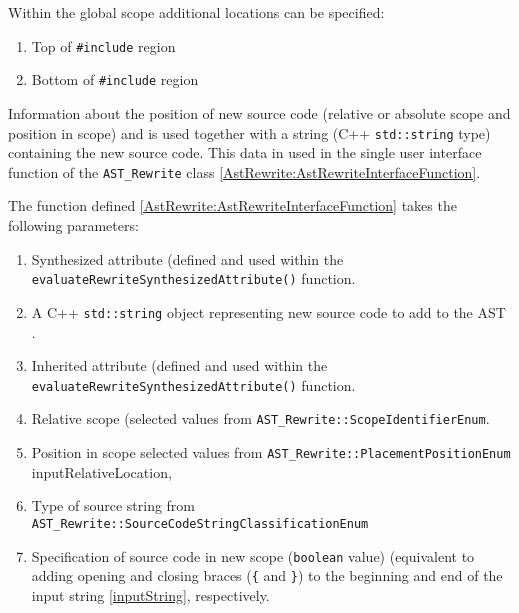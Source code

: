 {Within the global scope additional locations can be specified:
\begin{enumerate}
     \item Top of {\tt \#include} region
     \item Bottom of {\tt \#include} region
\end{enumerate}


Information about the position of new source code (relative or absolute scope and position
in scope) and is used together with a string (C++ {\tt std::string} type) containing the new
source code. This data in used in the single user interface function of the 
{\tt AST\_Rewrite} class \ref{AstRewrite:AstRewriteInterfaceFunction}.

{\indent
{\mySmallFontSize

\label{AstRewrite:AstRewriteInterfaceFunction}

\begin{latexonly}
   
\end{latexonly}

\begin{htmlonly}
   
\end{htmlonly}

}
}


The function defined \ref{AstRewrite:AstRewriteInterfaceFunction} takes the following
parameters:
\begin{enumerate}
     \item Synthesized attribute (defined and used within the {\tt
           evaluateRewriteSynthesizedAttribute()} function.
     \item A C++ {\tt std::string} object representing new source 
           code to add to the AST \label{inputString}.
     \item Inherited attribute (defined and used within the {\tt
           evaluateRewriteSynthesizedAttribute()} function.
     \item Relative scope (selected values from 
           {\tt AST\_Rewrite::ScopeIdentifierEnum}.
     \item Position in scope selected values from 
           {\tt AST\_Rewrite::PlacementPositionEnum} inputRelativeLocation,
     \item Type of source string from
           {\tt AST\_Rewrite::SourceCodeStringClassificationEnum}
     \item Specification of source code in new scope ({\tt boolean} value)
           (equivalent to adding opening and closing braces ({\tt \{} and {\tt \}}) to the beginning and end 
           of the input string \ref{inputString}, respectively.
\end{enumerate}
}

